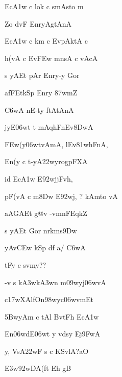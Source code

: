 \dnnemslokab 
{\dn Ec\3A1w\2 c lok\2 c smAsto m\? \dandadn\dontdisplaylinenum}

\dnnemslokac 
{\dn {}Zo d\?vF EnryAgtAnA\2}
\dontdisplaylinenum

\dnnemslokad 
{\dn Ec\3A1w\2 c km{\rdt} c EvpAktA\2 c \vegdn\dontdisplaylinenum}


\ujvers\dnnemsloka 
{\dn h(vA c Ev\3FEw\2 mnsA c vAcA}
\dontdisplaylinenum

\dnnemslokab 
{\dn s yAEt pAr\2 Enry-y Gor \dandadn\dontdisplaylinenum}

\dnnemslokac 
{\dn afFEtkSp\2 Enry\? \387wm\?Z}
\dontdisplaylinenum

\dnnemslokad 
{\dn {}\3C6wA nE-ty\0 ftAtAnA \vegdn\dontdisplaylinenum}


\ujvers\dnnemsloka 
{\dn jyE\306wt t\? mAqhFnEv\38DwA}
\dontdisplaylinenum

\dnnemslokab 
{\dn \3FEw(y\306wtvAmA, lEv\381whFnA, \dandadn\dontdisplaylinenum}

\dnnemslokac 
{\dn En(y\2 c t-yA\322wyrogpFXA}
\dontdisplaylinenum

\dnnemslokad 
{\dn id  Ec\3A1w\2 E\392wjjFvh\0, \vegdn\dontdisplaylinenum}


\ujvers\dnnemsloka 
{\dn pF(vA c m\38Dw\2 E\392wj, {\rs ?\re} kAmto vA}
\dontdisplaylinenum

\dnnemslokab 
{\dn aAG\5AEt g@v\2 -vmnFEqk\?Z \dandadn\dontdisplaylinenum}

\dnnemslokac 
{\dn s yAEt Gor\2 nrkms\39Dw\2}
\dontdisplaylinenum

\dnnemslokad 
{\dn yAv\3CEw kSp\2 df a/ \3C6wA \vegdn\dontdisplaylinenum}


\ujvers\dnnemsloka 
{\dn tFy{\rdt} c sv\0my{\rs ??\re}}
\dontdisplaylinenum

\dnnemslokab 
{\dn -v\2 s k\3A3wk\3A3w\?n m\309wyj\306wvA \dandadn\dontdisplaylinenum}

\dnnemslokac 
{\dn c\317wXAlfOn\398wyc\306wvm\?Et}
\dontdisplaylinenum

\dnnemslokad 
{\dn \35BwyAm\2 c tAl BvtFh Ec\3A1w \vegdn\dontdisplaylinenum}


\ujvers\dnnemsloka 
{\dn En\306wdE\306wt y\? v\?dsy Ej\39FwA}
\dontdisplaylinenum

\dnnemslokab 
{\dn y, VsA\322wF s c KSvlA{\rs ?\re}aO \dandadn\dontdisplaylinenum}

\dnnemslokac 
{\dn {}\3E3w\392wDA(ft\2 Eh gB\?{\qvb}}
\dontdisplaylinenum

